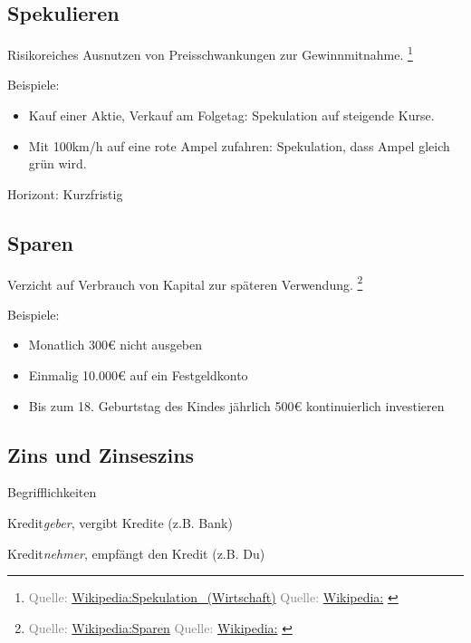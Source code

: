 \documentclass{beamer}
\let\oldfootnote\footnote
\renewcommand{\footnote}[1]
{%
	\oldfootnote
	{
		\tiny
		\textcolor{gray}{#1}
	}%
}
\newcommand{\citewiki}[2][]
{%
	\footnote
	{
		\ifthenelse{\isempty{#1}}
		{
			Quelle: \href{https://de.wikipedia.org/wiki/#2}{Wikipedia:#2}
		}
		{
			Quelle: \href{https://de.wikipedia.org/wiki/#2}{Wikipedia:#1}
		}
	}
}
\begin{document}
		\subsection{Spekulieren}
		
			\begin{frame}
				\begin{definition}
					Risikoreiches Ausnutzen von Preisschwankungen zur Gewinnmitnahme.\citewiki{Spekulation\_(Wirtschaft)}
				\end{definition}\hfill
			
				Beispiele:
				\begin{itemize}
					\item Kauf einer Aktie, Verkauf am Folgetag: Spekulation auf steigende Kurse.
					\item Mit 100km/h auf eine rote Ampel zufahren: Spekulation, dass Ampel gleich grün wird.
				\end{itemize}\hfill
				
				Horizont: Kurzfristig
			\end{frame}
		
		\subsection{Sparen}
		
			\begin{frame}
				\begin{definition}
					Verzicht auf Verbrauch von Kapital zur späteren Verwendung.\citewiki{Sparen}
				\end{definition}\hfill
				
				Beispiele:
				\begin{itemize}
					\item Monatlich 300€ nicht ausgeben
					\item Einmalig 10.000€ auf ein Festgeldkonto
					\item Bis zum 18. Geburtstag des Kindes jährlich 500€ kontinuierlich investieren
				\end{itemize}
			\end{frame}
		
		\subsection{Zins und Zinseszins}
		
			\begin{frame}{Begrifflichkeiten}
				\begin{description}[labelwidth=0cm]
					\item[Gläubiger] Kredit\textit{geber}, vergibt Kredite (z.B. Bank)\pause
					\item[Schuldner] Kredit\textit{nehmer}, empfängt den Kredit (z.B. Du)
				\end{description}
			\end{frame}
		
\end{document}
